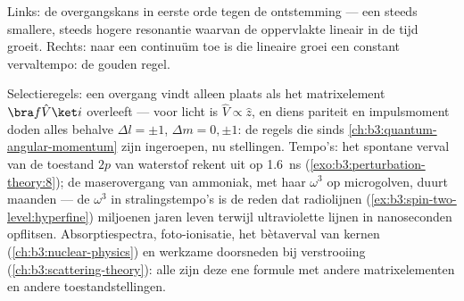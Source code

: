 \begin{omfigure}

{\small Links: de overgangskans in eerste orde tegen de ontstemming ---
een steeds smallere, steeds hogere resonantie waarvan de oppervlakte
lineair in de tijd groeit. Rechts: naar een continuüm toe is die lineaire
groei een constant vervaltempo: de gouden regel.}
\end{omfigure}

\begin{example}\label{ex:b3:perturbation-theory:applications}
Selectieregels: een overgang vindt alleen plaats als het matrixelement
$\bra f\hat V\ket i$ overleeft --- voor licht is $\hat V \propto \hat
z$,
en diens pariteit en impulsmoment doden alles behalve $\Delta l = \pm1$,
$\Delta m = 0, \pm1$: de regels die sinds
\cref{ch:b3:quantum-angular-momentum} zijn ingeroepen, nu stellingen.
Tempo's: het spontane verval van de toestand $2p$ van waterstof rekent uit
op \qty{1.6}{ns} (\cref{exo:b3:perturbation-theory:8}); de maserovergang
van ammoniak, met haar $\omega^3$ op microgolven, duurt maanden --- de
$\omega^3$ in stralingstempo's is de reden dat radiolijnen
(\cref{ex:b3:spin-two-level:hyperfine}) miljoenen jaren leven terwijl
ultraviolette lijnen in nanoseconden opflitsen. Absorptiespectra,
foto-ionisatie, het bètaverval van kernen
(\cref{ch:b3:nuclear-physics}) en werkzame doorsneden bij verstrooiing
(\cref{ch:b3:scattering-theory}): alle zijn deze ene formule met andere
matrixelementen en andere toestandstellingen.
\end{example}

